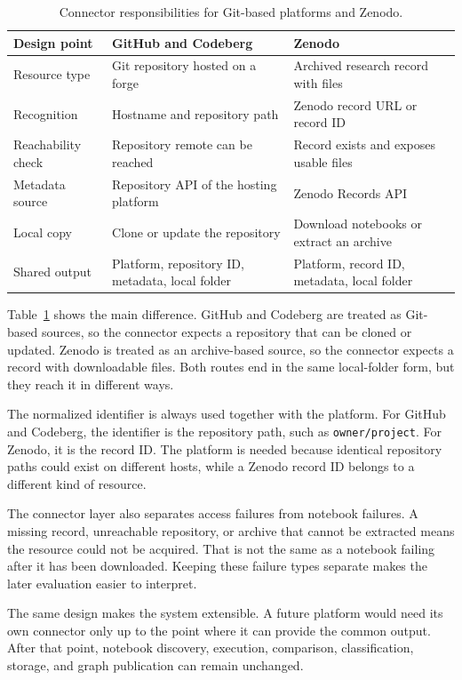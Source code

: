 \begin{table}[htbp]
\centering
\caption{Connector responsibilities for Git-based platforms and Zenodo.}
\label{tab:connector-architecture}
\small
\begin{tabularx}{\textwidth}{@{}p{3.0cm}XX@{}}
\toprule
Design point & GitHub and Codeberg & Zenodo\tabularnewline
\midrule
Resource type & Git repository hosted on a forge & Archived research record with files\tabularnewline
Recognition & Hostname and repository path & Zenodo record URL or record ID\tabularnewline
Reachability check & Repository remote can be reached & Record exists and exposes usable files\tabularnewline
Metadata source & Repository API of the hosting platform & Zenodo Records API\tabularnewline
Local copy & Clone or update the repository & Download notebooks or extract an archive\tabularnewline
Shared output & Platform, repository ID, metadata, local folder & Platform, record ID, metadata, local folder\tabularnewline
\bottomrule
\end{tabularx}
\end{table}

Table~\ref{tab:connector-architecture} shows the main difference. GitHub and Codeberg are treated as Git-based sources, so the connector expects a repository that can be cloned or updated. Zenodo is treated as an archive-based source, so the connector expects a record with downloadable files. Both routes end in the same local-folder form, but they reach it in different ways.

The normalized identifier is always used together with the platform. For GitHub and Codeberg, the identifier is the repository path, such as \texttt{owner/project}. For Zenodo, it is the record ID. The platform is needed because identical repository paths could exist on different hosts, while a Zenodo record ID belongs to a different kind of resource.

The connector layer also separates access failures from notebook failures. A missing record, unreachable repository, or archive that cannot be extracted means the resource could not be acquired. That is not the same as a notebook failing after it has been downloaded. Keeping these failure types separate makes the later evaluation easier to interpret.

The same design makes the system extensible. A future platform would need its own connector only up to the point where it can provide the common output. After that point, notebook discovery, execution, comparison, classification, storage, and graph publication can remain unchanged.

